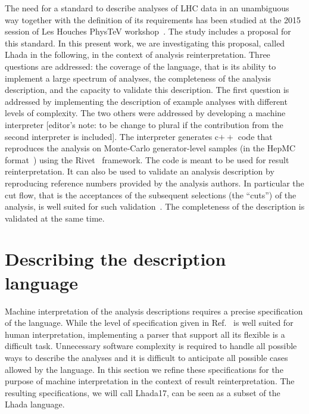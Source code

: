 \documentclass[11pt]{cernrep}
\begin{document}
The need for a standard to describe analyses of LHC data in an unambiguous way together with the definition of its requirements has been studied at the 2015 session of Les Houches PhysTeV workshop~\cite{Brooijmans:2016vro}. The study includes a proposal for this standard. In this present work, we are investigating this proposal, called {\sc Lhada} in the following, in the context of analysis reinterpretation. Three questions are addressed: the coverage of the language, that is its ability to implement a large spectrum of analyses, the completeness of the analysis description, and the capacity to validate this description. The first question is addressed by implementing the description of example analyses with different levels of complexity. The two others were addressed by developing a machine interpreter [editor's note: to be change to plural if the contribution from the second interpreter is included]. The interpreter generates c$++$ code that reproduces the analysis on Monte-Carlo generator-level samples (in the {\sc HepMC} format~\cite{Dobbs:2001ck}) using the Rivet~\cite{Buckley:2010ar} framework. The code is meant to be used for result reinterpretation. It can also be used to validate an analysis description by reproducing reference numbers provided by the analysis authors. In particular the cut flow, that is the acceptances of the subsequent selections (the ``cuts'') of the analysis, is well suited for such validation~\cite{Kraml:2012sg}. The completeness of the description is validated at the same time.

\section{Describing the description language}\label{sec:desc}

Machine interpretation of the analysis descriptions requires a precise specification of the language. While the level of specification given in Ref.~\cite{Brooijmans:2016vro} is well suited for human interpretation, implementing a parser that support all its flexible is a difficult task. Unnecessary software complexity is required to handle all possible ways to describe the analyses and it is difficult to anticipate all possible cases allowed by the language. In this section we refine these specifications for the purpose of machine interpretation in the context of result reinterpretation. The resulting specifications, we will call {\sc Lhada}17, can be seen as a subset of the {\sc Lhada} language.
\end{document}
